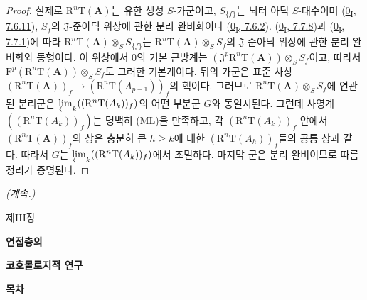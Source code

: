 \begin{proof}
실제로 $\mathrm R^n\mathrm T(\mathbf A)$는 유한 생성 $S$-가군이고,
$S_{\{f\}}$는 뇌터 아딕 $S$-대수이며
(\hyperref[0.7.6.11-ko]{0\textsubscript{I}, 7.6.11}),
$S_f$의 $\mathfrak J$-준아딕 위상에 관한 분리 완비화이다
(\hyperref[0.7.6.2-ko]{0\textsubscript{I}, 7.6.2}).
(\hyperref[0.7.7.8-ko]{0\textsubscript{I}, 7.7.8})과
(\hyperref[0.7.7.1-ko]{0\textsubscript{I}, 7.7.1})에 따라
$\mathrm R^n\mathrm T(\mathbf A)\otimes_S S_{\{f\}}$는
$\mathrm R^n\mathrm T(\mathbf A)\otimes_S S_f$의
$\mathfrak J$-준아딕 위상에 관한 분리 완비화와 동형이다. 이 위상에서
0의 기본 근방계는
$(\mathfrak J^p\mathrm R^n\mathrm T(\mathbf A))\otimes_S S_f$이고,
따라서
$\mathrm F^p(\mathrm R^n\mathrm T(\mathbf A))\otimes_S S_f$도 그러한
기본계이다. 뒤의 가군은 표준 사상
$(\mathrm R^n\mathrm T(\mathbf A))_f\to
(\mathrm R^n\mathrm T(A_{p-1}))_f$의 핵이다. 그러므로
$\mathrm R^n\mathrm T(\mathbf A)\otimes_S S_f$에 연관된 분리군은
$\varprojlim_k((\mathrm R^n\mathrm T(A_k))_f)$의 어떤 부분군 $G$와
동일시된다. 그런데 사영계
$((\mathrm R^n\mathrm T(A_k))_f)$는 명백히 (ML)을 만족하고,
각 $(\mathrm R^n\mathrm T(A_k))_f$ 안에서
$(\mathrm R^n\mathrm T(\mathbf A))_f$의 상은 충분히 큰 $h\geq k$에
대한 $(\mathrm R^n\mathrm T(A_h))_f$들의 공통 상과 같다. 따라서
$G$는 $\varprojlim_k((\mathrm R^n\mathrm T(A_k))_f)$에서 조밀하다.
마지막 군은 분리 완비이므로 따름정리가 증명된다.
\end{proof}

\begin{flushright}

\textit{(계속.)}
\end{flushright}

\clearpage
\thispagestyle{empty}
\null
\clearpage
\thispagestyle{plain}
\label{chapter:III-fr}

\begin{center}
{\large 제III장\par}
\vspace{1.5em}
{\Large\bfseries 연접층의\par}
{\Large\bfseries 코호몰로지적 연구\par}
\vspace{1.8em}
{\bfseries 목차\par}
\end{center}

